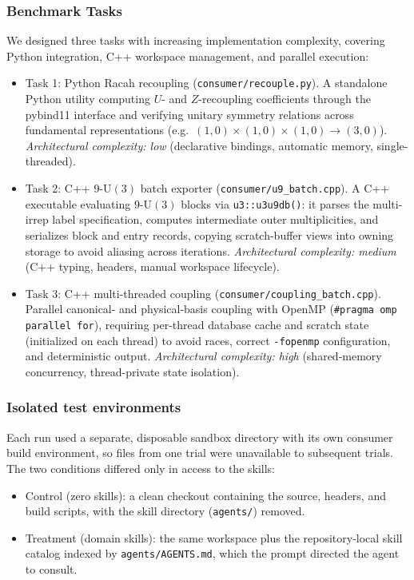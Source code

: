 \documentclass[aps,onecolumn,10pt,superscriptaddress,floatfix,nofootinbib]{revtex4}
\begin{document}
\subsubsection{Benchmark Tasks}
We designed three tasks with increasing implementation complexity, covering Python integration, C++ workspace management, and parallel execution:
\begin{itemize}
    \item {Task 1: Python Racah recoupling (\texttt{consumer/recouple.py}).}
    A standalone Python utility computing $U$- and $Z$-recoupling coefficients through the pybind11 interface and verifying unitary symmetry relations across fundamental representations (e.g.\ $(1,0){\times}(1,0){\times}(1,0)\to(3,0)$). \emph{Architectural complexity: low} (declarative bindings, automatic memory, single-threaded).
    
    \item {Task 2: C++ 9-$\mathrm{U}(3)$ batch exporter (\texttt{consumer/u9\_batch.cpp}).}
    A C++ executable evaluating 9-$\mathrm{U}(3)$ blocks via \verb|u3::u3u9db()|: it parses the multi-irrep label specification, computes intermediate outer multiplicities, and serializes block and entry records, copying scratch-buffer views into owning storage to avoid aliasing across iterations. \emph{Architectural complexity: medium} (C++ typing, headers, manual workspace lifecycle).

    \item {Task 3: C++ multi-threaded coupling (\texttt{consumer/coupling\_batch.cpp}).}
    Parallel canonical- and physical-basis coupling with OpenMP (\verb|#pragma omp parallel for|), requiring per-thread database cache and scratch state (initialized on each thread) to avoid races, correct \verb|-fopenmp| configuration, and deterministic output. \emph{Architectural complexity: high} (shared-memory concurrency, thread-private state isolation).
\end{itemize}

\subsubsection{Isolated test environments}
Each run used a separate, disposable sandbox directory with its own consumer
build environment, so files from one trial were unavailable to subsequent
trials. The two conditions differed only in access to the skills:
\begin{itemize}
    \item {Control (zero skills):} a clean checkout containing the source, headers, and build scripts, with the skill directory (\verb|agents/|) removed.
    \item {Treatment (domain skills):} the same workspace plus the repository-local skill catalog indexed by \verb|agents/AGENTS.md|, which the prompt directed the agent to consult.
\end{itemize}
\end{document}
